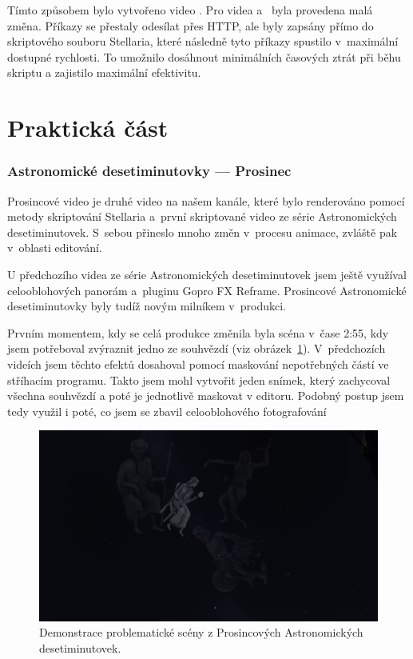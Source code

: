 \documentclass[12pt,a4paper,titlepage]{article}
\begin{document}
Tímto způsobem bylo vytvořeno video . Pro videa  a~ byla provedena malá změna. Příkazy se přestaly odesílat přes HTTP, ale byly zapsány přímo do skriptového souboru Stellaria, které následně tyto příkazy spustilo v~maximální dostupné rychlosti. To umožnilo dosáhnout minimálních časových ztrát při běhu skriptu a zajistilo maximální efektivitu.
\newpage
\part{Praktická část}
\section{Astronomické desetiminutovky --- Prosinec}
Prosincové video je druhé video na našem kanále, které bylo renderováno pomocí metody skriptování Stellaria a~první skriptované video ze série Astronomických desetiminutovek. S~sebou přineslo mnoho změn v~procesu animace, zvláště pak v~oblasti editování. 

U předchozího videa ze série Astronomických desetiminutovek jsem ještě využíval celooblohových panorám a~pluginu Gopro FX Reframe. Prosincové Astronomické desetiminutovky byly tudíž novým milníkem v~produkci.

Prvním momentem, kdy se celá produkce změnila byla scéna v~čase 2:55, kdy jsem potřeboval zvýraznit jedno ze souhvězdí (viz obrázek~\ref{prac:ac12_1}). V~předchozích videích jsem těchto efektů dosahoval pomocí maskování nepotřebných částí ve stříhacím programu. Takto jsem mohl vytvořit jeden snímek, který zachycoval všechna souhvězdí a poté je jednotlivě maskovat v editoru. Podobný postup jsem tedy využil i poté, co jsem se zbavil celooblohového fotografování

\begin{figure}[h]
	\centering
	\includegraphics[width=.95\textwidth]{ac12_1.png}
	\caption{Demonstrace problematické scény z Prosincových Astronomických desetiminutovek.}\label{prac:ac12_1}
\end{figure}
\end{document}
